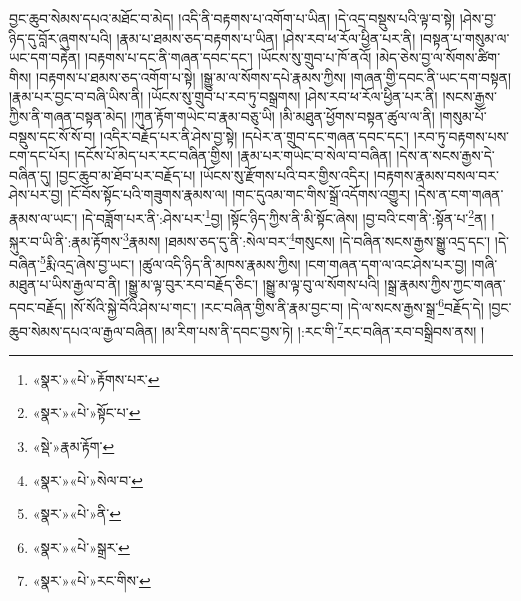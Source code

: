 བྱང་ཆུབ་སེམས་དཔའ་མཐོང་བ་མེད། །འདི་ནི་བརྟགས་པ་འགོག་པ་ཡིན། །དེ་འདྲ་བསྡུས་པའི་ལྟ་བ་སྟེ། །ཤེས་བྱ་ཉིད་དུ་བློར་ཞུགས་པའི། །རྣམ་པ་ཐམས་ཅད་བརྟགས་པ་ཡིན། །ཤེས་རབ་ཕ་རོལ་ཕྱིན་པར་ནི། །བསྟན་པ་གསུམ་ལ་ཡང་དག་བརྟེན། །བརྟགས་པ་དང་ནི་གཞན་དབང་དང་། །ཡོངས་སུ་གྲུབ་པ་ཁོ་ནའོ། །མེད་ཅེས་བྱ་ལ་སོགས་ཚིག་གིས། །བརྟགས་པ་ཐམས་ཅད་འགོག་པ་སྟེ། །སྒྱུ་མ་ལ་སོགས་དཔེ་རྣམས་ཀྱིས། །གཞན་གྱི་དབང་ནི་ཡང་དག་བསྟན། །རྣམ་པར་བྱང་བ་བཞི་ཡིས་ནི། །ཡོངས་སུ་གྲུབ་པ་རབ་ཏུ་བསྒྲགས། །ཤེས་རབ་ཕ་རོལ་ཕྱིན་པར་ནི། །སངས་རྒྱས་ཀྱིས་ནི་གཞན་བསྟན་མེད། །ཀུན་རྟོག་གཡེང་བ་རྣམ་བཅུ་ཡི། །མི་མཐུན་ཕྱོགས་བསྟན་ཚུལ་ལ་ནི། །གསུམ་པོ་བསྡུས་དང་སོ་སོ་བ། །འདིར་བརྗོད་པར་ནི་ཤེས་བྱ་སྟེ། །དཔེར་ན་གྲུབ་དང་གཞན་དབང་དང་། །རབ་ཏུ་བརྟགས་པས་ངག་དང་པོར། །དངོས་པོ་མེད་པར་རང་བཞིན་གྱིས། །རྣམ་པར་གཡེང་བ་སེལ་བ་བཞིན། །དེས་ན་སངས་རྒྱས་དེ་བཞིན་དུ། །བྱང་ཆུབ་མ་ཐོབ་པར་བརྗོད་པ། །ཡོངས་སུ་རྫོགས་པའི་བར་གྱིས་འདིར། །བརྟགས་རྣམས་བསལ་བར་ཤེས་པར་བྱ། །ངོ་བོས་སྟོང་པའི་གཟུགས་རྣམས་ལ། །གང་དུའམ་གང་གིས་སྒྲོ་འདོགས་འགྱུར། །དེས་ན་ངག་གཞན་རྣམས་ལ་ཡང་། །དེ་བཟློག་པར་ནི་:ཤེས་པར་\footnote{«སྣར་»«པེ་»རྟོགས་པར་}བྱ། །སྟོང་ཉིད་ཀྱིས་ནི་མི་སྟོང་ཞེས། །བྱ་བའི་ངག་ནི་:སྟོན་པ་\footnote{«སྣར་»«པེ་»སྟོང་པ་}ན། །སྐུར་བ་ཡི་ནི་:རྣམ་རྟོགས་\footnote{«སྡེ་»རྣམ་རྟོག་}རྣམས། །ཐམས་ཅད་དུ་ནི་:སེལ་བར་\footnote{«སྣར་»«པེ་»སེལ་བ་}གསུངས། །དེ་བཞིན་སངས་རྒྱས་སྒྱུ་འདྲ་དང་། །དེ་བཞིན་\footnote{«སྣར་»«པེ་»ནི་}རྨི་འདྲ་ཞེས་བྱ་ཡང་། །ཚུལ་འདི་ཉིད་ནི་མཁས་རྣམས་ཀྱིས། །ངག་གཞན་དག་ལ་འང་ཤེས་པར་བྱ། །གཞི་མཐུན་པ་ཡིས་རྒྱལ་བ་ནི། །སྒྱུ་མ་ལྟ་བུར་རབ་བརྗོད་ཅིང་། །སྒྱུ་མ་ལྟ་བུ་ལ་སོགས་པའི། །སྒྲ་རྣམས་ཀྱིས་ཀྱང་གཞན་དབང་བརྗོད། །སོ་སོའི་སྐྱེ་བོའི་ཤེས་པ་གང་། །རང་བཞིན་གྱིས་ནི་རྣམ་བྱང་བ། །དེ་ལ་སངས་རྒྱས་སྒྲ་\footnote{«སྣར་»«པེ་»སྒྲར་}བརྗོད་དེ། །བྱང་ཆུབ་སེམས་དཔའ་ལ་རྒྱལ་བཞིན། །མ་རིག་པས་ནི་དབང་བྱས་ཏེ། །:རང་གི་\footnote{«སྣར་»«པེ་»རང་གིས་}རང་བཞིན་རབ་བསྒྲིབས་ནས། །
